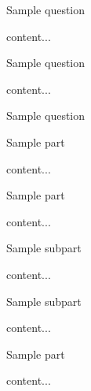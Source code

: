 \documentclass[11pt]{article} %
\begin{document}
\begin{qstn}[8]
	Sample question
\begin{soln}
	content...
\end{soln}
\end{qstn}

\begin{qstn}[9]
	Sample question
\begin{soln}
	content...
\end{soln}
\end{qstn}

\begin{qstn}[10]
	Sample question
\begin{assgnenum}
	\qitem Sample part
	\begin{soln}
		content...
	\end{soln}
	\qitem Sample part
	\begin{soln}
		content...
	\end{soln}
	\begin{assgnenum}
		\qitem Sample subpart
		\begin{soln}
			content...
		\end{soln}
		\qitem Sample subpart
		\begin{soln}
			content...
		\end{soln}
	\end{assgnenum}
	\qitem Sample part
	\begin{soln}
		content...
	\end{soln}
\end{assgnenum}
\end{qstn}
\end{document}
